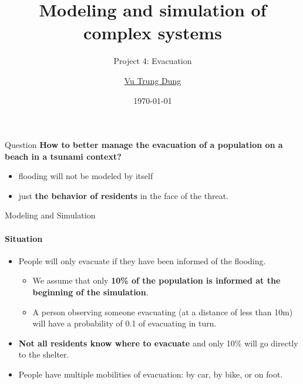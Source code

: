 \documentclass{beamer}
\title{Modeling and simulation of complex systems}
\subtitle{Project 4: Evacuation}
\author{\href{mailto:dungvt2440071@usth.edu.vn}{Vu Trung Dung}}
\date{\today}
\begin{document}
\maketitle
{} %



\begin{frame}[fragile]{Question}
\textbf{How to better manage the evacuation of a population on a beach
in a tsunami context?}

\begin{itemize}
\item flooding will not be modeled by itself
\item just \textbf{the behavior of residents} in the face of the threat.
\end{itemize}
\end{frame}


\begin{frame}[fragile]{Modeling and Simulation}
\framesubtitle{Situation}
\begin{itemize}
\item People will only evacuate if they have been informed of the flooding. 
\begin{itemize}
    \item We assume that only \textbf{10\% of the population is informed at the beginning of the simulation}.
    \item A person observing someone evacuating
    (at a distance of less than 10m) will have a probability of 0.1 of evacuating in turn.
\end{itemize}
\item \textbf{Not all residents know where to evacuate} and only 10\% will go directly to the shelter.
\item People have multiple mobilities of evacuation: by car, by bike, or on foot.
\end{itemize}
\end{frame}
\end{document}
